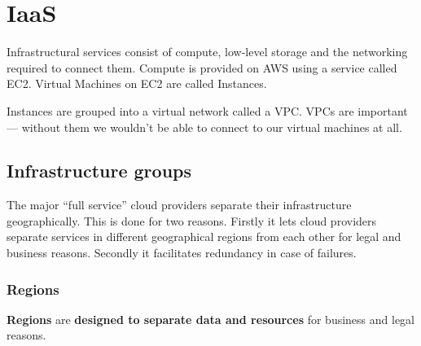\chapter{IaaS}

Infrastructural services consist of compute, low-level storage and the networking required to connect them.
Compute is provided on AWS using a service called EC2.
Virtual Machines on EC2 are called Instances.

Instances are grouped into a virtual network called a VPC.
VPCs are important --- without them we wouldn't be able to connect to our virtual machines at all.


\section{Infrastructure groups}
\label{sec:infrastructure-groups}

The major ``full service'' cloud providers separate their infrastructure
geographically. This is done for two reasons. Firstly it lets cloud
providers separate services in different geographical regions from each
other for legal and business reasons. Secondly it facilitates redundancy
in case of failures.

\subsection{Regions}
\label{sec:regions}

\textbf{Regions} are \textbf{designed to separate data and resources} for business and legal reasons.

